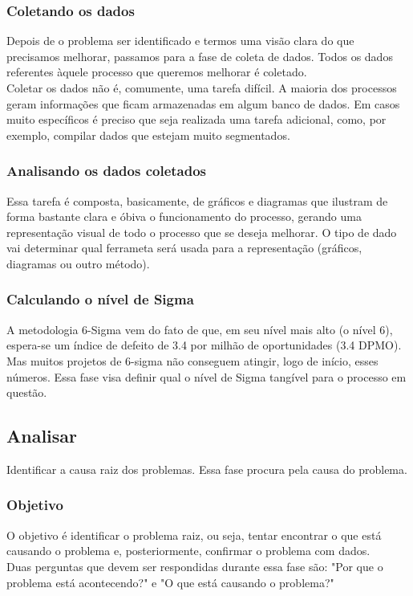 \documentclass{abnt}
\begin{document}
					\subsubsection {Coletando os dados}
					Depois de o problema ser identificado e termos uma visão clara do que precisamos melhorar, passamos para a 
					fase de coleta de dados. Todos os dados referentes àquele processo que queremos melhorar é coletado.
					\\
					Coletar os dados não é, comumente, uma tarefa difícil. A maioria dos processos geram informações que 
					ficam armazenadas em algum banco de dados. Em casos muito específicos é preciso que seja realizada uma 
					tarefa adicional, como, por exemplo, compilar dados que estejam muito segmentados.
					
					\subsubsection {Analisando os dados coletados}
					Essa tarefa é composta, basicamente, de gráficos e diagramas que ilustram de forma bastante clara e óbiva 
					o funcionamento do processo, gerando uma representação visual de todo o processo que se deseja melhorar. O tipo de dado vai determinar qual 
					ferrameta será usada para a representação (gráficos, diagramas ou outro método).
					\subsubsection {Calculando o nível de Sigma}
					A metodologia 6-Sigma vem do fato de que, em seu nível mais alto (o nível 6), espera-se um índice de 
					defeito de 3.4 por milhão de oportunidades (3.4 DPMO). Mas muitos projetos de 6-sigma não conseguem 
					atingir, logo de início, esses números. Essa fase visa definir qual o nível de Sigma tangível para o 
					processo em questão.
				\subsection {Analisar}
					Identificar a causa raiz dos problemas. Essa fase procura pela causa do problema.
					\subsubsection {Objetivo}
					O objetivo é identificar o problema raiz, ou seja, tentar encontrar o que está causando o problema 
					e, posteriormente, confirmar o problema com dados.\\
					Duas perguntas que devem ser respondidas durante essa fase são: "Por que o problema está acontecendo?" e 
					"O que está causando o problema?"
\end{document}
